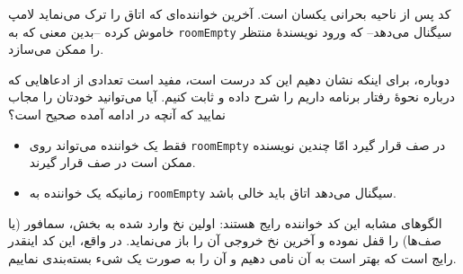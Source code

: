 \documentclass{book}
\begin{document}
    کد پس از ناحیه بحرانی یکسان است. آخرین خواننده‌ای که اتاق را ترک می‌نماید لامپ خاموش کرده --بدین معنی که به {\tt roomEmpty}
    سیگنال می‌دهد-- که ورود نویسندهٔ منتظر را ممکن می‌سازد. 

    دوباره، برای اینکه نشان دهیم این کد درست است، مفید است 
    تعدادی از ادعاهایی که درباره نحوهٔ رفتار برنامه داریم را شرح داده و ثابت کنیم. 
    آیا می‌توانید خودتان را مجاب نمایید که آنچه در ادامه آمده صحیح است؟

\begin{itemize}

\item 
    فقط یک خواننده می‌تواند روی {\tt roomEmpty} در صف قرار گیرد امّا چندین نویسنده ممکن است در صف قرار گیرند. 

\item 
    زمانیکه یک خواننده به {\tt roomEmpty} سیگنال می‌دهد اتاق باید خالی باشد. 
\end{itemize}



    الگوهای مشابه این کد خواننده رایج هستند: اولین نخ وارد شده به بخش، سمافور (یا صف‌ها) را قفل نموده و آخرین نخ خروجی آن را باز می‌نماید. 
    در واقع، این کد اینقدر رایج است که بهتر است به آن نامی دهیم و آن را به صورت یک شیء بسته‌بندی نماییم. 
    
\end{document}
